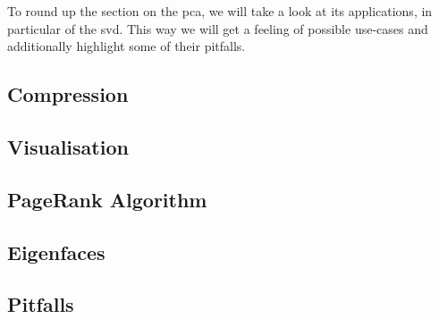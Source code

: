 To round up the section on the \acrlong{pca}, we will take a look at its applications, in particular of the \acrlong{svd}.
This way we will get a feeling of possible use-cases and additionally highlight some of their pitfalls.


\subsection{Compression}

\clearpage

\subsection{Visualisation}

\clearpage

\subsection{PageRank Algorithm}

\clearpage

\subsection{Eigenfaces} \label{sec:eigenfaces}

\clearpage

\subsection{Pitfalls}

\clearpage
